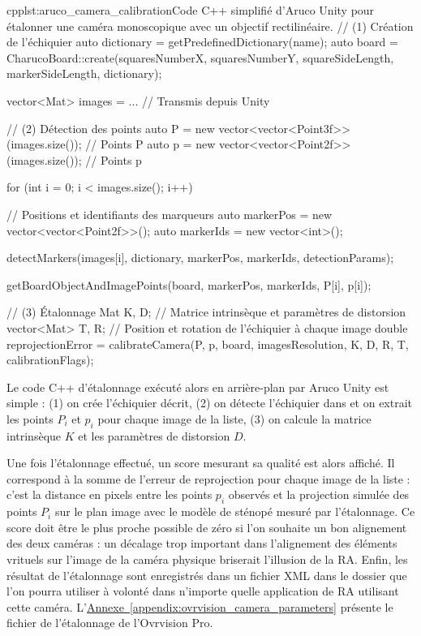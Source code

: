 \begin{listingETS}{cpp}{lst:aruco_camera_calibration}{Code C++ simplifié d'Aruco Unity pour étalonner une caméra monoscopique avec un objectif rectilinéaire.}
  // (1) Création de l'échiquier
  auto dictionary = getPredefinedDictionary(name);
  auto board = CharucoBoard::create(squaresNumberX, squaresNumberY, squareSideLength, markerSideLength, dictionary);

  vector<Mat> images = ... // Transmis depuis Unity

  // (2) Détection des points
  auto P = new vector<vector<Point3f>>(images.size()); // Points P
  auto p = new vector<vector<Point2f>>(images.size()); // Points p

  for (int i = 0; i < images.size(); i++) {
    // Positions et identifiants des marqueurs
    auto markerPos = new vector<vector<Point2f>>();
    auto markerIds = new vector<int>();

    detectMarkers(images[i], dictionary, markerPos, markerIds, detectionParams);

    getBoardObjectAndImagePoints(board, markerPos, markerIds, P[i], p[i]);
  }

  // (3) Étalonnage
  Mat K, D; // Matrice intrinsèque et paramètres de distorsion
  vector<Mat> T, R; // Position et rotation de l'échiquier à chaque image
  double reprojectionError = calibrateCamera(P, p, board, imagesResolution, K, D, R, T, calibrationFlags);
\end{listingETS}

Le code C++ d'étalonnage exécuté alors en arrière-plan par Aruco Unity  est simple : (1) on crée l'échiquier décrit, (2) on détecte l'échiquier dans et on extrait les points $P_i$ et $p_i$ pour chaque image de la liste, (3) on calcule la matrice intrinsèque $K$ et les paramètres de distorsion $D$.

Une fois l'étalonnage effectué, un score mesurant sa qualité est alors affiché. Il correspond à la somme de l'erreur de reprojection pour chaque image de la liste : c'est la distance en pixels entre les points $p_i$ observés et la projection simulée des points $P_i$ sur le plan image avec le modèle de sténopé mesuré par l'étalonnage. Ce score doit être le plus proche possible de zéro si l'on souhaite un bon alignement des deux caméras : un décalage trop important dans l'alignement des éléments vrituels sur l'image de la caméra physique briserait l'illusion de la RA. Enfin, les résultat de l'étalonnage sont enregistrés dans un fichier XML dans le dossier  que l'on pourra utiliser à volonté dans n'importe quelle application de RA utilisant cette caméra. L'\hyperref[appendix:ovrvision_camera_parameters]{Annexe~\ref{appendix:ovrvision_camera_parameters}} présente le fichier de l'étalonnage de l'Ovrvision Pro.

